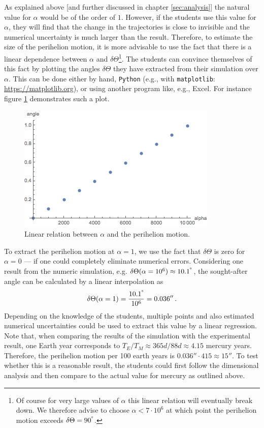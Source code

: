 \documentclass[12pt, UK english]{iopart}
\newcommand{\python}[0]{\texttt{Python} }
\begin{document}
As explained above [and further discussed in chapter \ref{sec:analysis}] the natural value for $\alpha$ would be of the order of $1$.
However, if the students use this value for $\alpha$, they will find that the change in the trajectories is close to invisible and the numerical uncertainty is much larger than the result.
Therefore, to estimate the size of the perihelion motion, it is more advisable to use the fact that there is a linear dependence between $\alpha$ and $\delta \Theta$\footnote{%
	Of course for very large values of $\alpha$ this linear relation will eventually break down.
	We therefore advise to choose $\alpha<7\cdot 10^6$ at which point the perihelion motion exceeds $\delta \Theta=90^{\degree}$.
}.
The students can convince themselves of this fact by plotting the angles $\delta \Theta$ they have extracted from their simulation over $\alpha$.
This can be done either by hand, \python (e.g., with \texttt{matplotlib}: \url{https://matplotlib.org}), or using another program like, e.g., Excel.
For instance figure \ref{fig:AlphaAngle} demonstrates such a plot.

\begin{figure}[htb]
	\centering
	\includegraphics[width=.8\textwidth]{figs/AlphaAngle.png}
	\caption{\label{fig:AlphaAngle} Linear relation between $\alpha$ and the perihelion motion.}
\end{figure}

To extract the perihelion motion at $\alpha = 1$, we use the fact that $\delta \Theta$ is zero for $\alpha =0$ --- if one could completely eliminate numerical errors.
Considering one result from the numeric simulation, e.g. $\delta\Theta(\alpha = 10^6) \approx 10.1^{\degree}$, the sought-after angle can be calculated by a linear interpolation as
\begin{equation}
	\delta\Theta (\alpha=1) = \frac{10.1^{\degree}}{10^6} = 0.036''
	\, .
\end{equation}
Depending on the knowledge of the students, multiple points and also estimated numerical uncertainties could be used to extract this value by a linear regression.
Note that, when comparing the results of the simulation with the experimental result, one Earth year corresponds to $T_E/T_M \approx 365d/88d\approx 4.15$ mercury years.
Therefore, the perihelion motion per 100 earth years is $0.036''\cdot 415\approx 15''$.
To test whether this is a reasonable result, the students could first follow the dimensional analysis and then compare to the actual value for mercury as outlined above.
\end{document}
